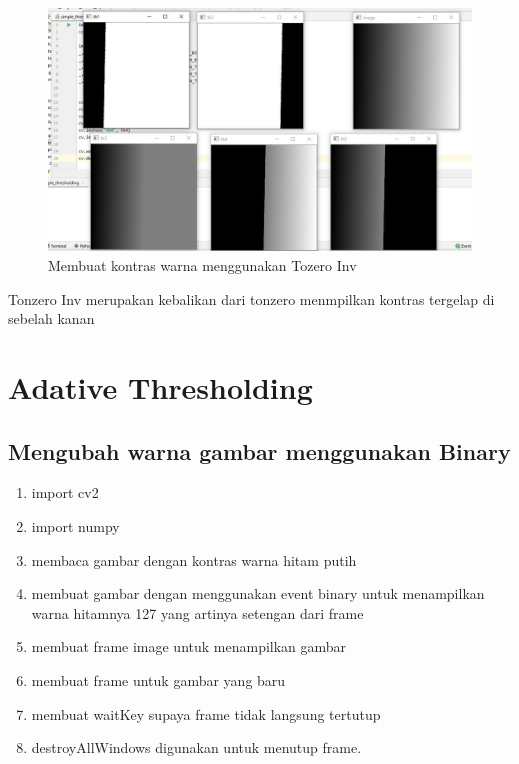 \begin{figure}[ht]
\centering
\includegraphics[scale=0.42]{figures/2,42.jpg}
\caption{Membuat kontras warna menggunakan Tozero Inv}
\label{contoh}
\end{figure}
Tonzero Inv merupakan kebalikan dari tonzero menmpilkan kontras tergelap di sebelah kanan




\newpage
\section{Adative Thresholding}
\subsection{Mengubah warna gambar menggunakan Binary}

\begin{enumerate}
	\item import cv2
	\item import numpy
	\item membaca gambar dengan kontras warna hitam putih
	\item membuat gambar dengan menggunakan event binary untuk menampilkan warna hitamnya 127 yang artinya setengan dari frame
	\item membuat frame image untuk menampilkan gambar
	\item membuat frame untuk gambar yang baru
	\item membuat waitKey supaya frame tidak langsung tertutup
	\item destroyAllWindows digunakan untuk menutup frame.
\end{enumerate}

